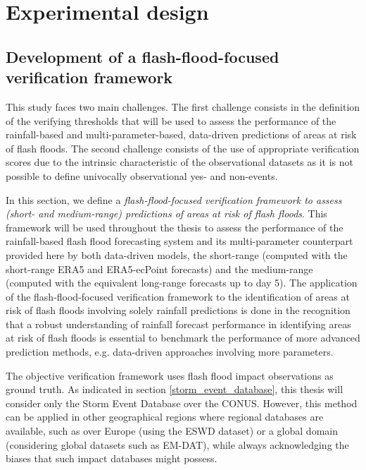 \chapter{Experimental design}
\label{experimental_design}
\graphicspath{{chapter_04/figures}{chapter_04/tables}}


\section{Development of a flash-flood-focused verification framework}

This study faces two main challenges. The first challenge consists in the definition of the verifying thresholds that will be used to assess the performance of the rainfall-based and multi-parameter-based, data-driven predictions of areas at risk of flash floods. The second challenge consists of the use of appropriate verification scores due to the intrinsic characteristic of the observational datasets as it is not possible to define univocally observational yes- and non-events. 

In this section, we define a \textit{flash-flood-focused verification framework to assess (short- and medium-range) predictions of areas at risk of flash floods}. This framework will be used throughout the thesis to assess the performance of the rainfall-based flash flood forecasting system and its multi-parameter counterpart provided here by both data-driven models, the short-range (computed with the short-range ERA5 and ERA5-ecPoint forecasts) and the medium-range (computed with the equivalent long-range forecasts up to day 5). The application of the flash-flood-focused verification framework to the identification of areas at risk of flash floods involving solely rainfall predictions is done in the recognition that a robust understanding of rainfall forecast performance in identifying areas at risk of flash floods is essential to benchmark the performance of more advanced prediction methods, e.g. data-driven approaches involving more parameters.

The objective verification framework uses flash flood impact observations as ground truth. As indicated in section \ref{storm_event_database}, this thesis will consider only the Storm Event Database over the CONUS. However, this method can be applied in other geographical regions where regional databases are available, such as over Europe (using the ESWD dataset) or a global domain (considering global datasets such as EM-DAT), while always acknowledging the biases that such impact databases might possess. 



